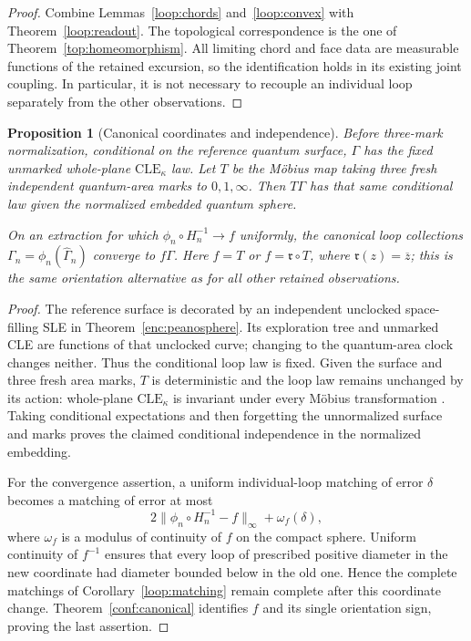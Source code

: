 \documentclass[11pt]{article}
\numberwithin{equation}{section}
\newtheorem{proposition}[theorem]{Proposition}
\theoremstyle{definition}
\theoremstyle{remark}
\newcommand{\1}{\mathbf 1}
\begin{document}
\begin{proof}
Combine Lemmas~\ref{loop:chords} and~\ref{loop:convex} with
Theorem~\ref{loop:readout}.  The topological correspondence is the
one of Theorem~\ref{top:homeomorphism}.  All limiting chord and face
data are measurable functions of the retained excursion, so the
identification holds in its existing joint coupling.  In particular,
it is not necessary to recouple an individual loop separately from
the other observations.
\end{proof}

\begin{proposition}[Canonical coordinates and independence]
\label{loop:canonical}
Before three-mark normalization, conditional on the reference quantum
surface, $\Gamma$ has the fixed unmarked whole-plane
$\mathrm{CLE}_{\kappa}$ law.  Let $T$ be the M\"obius map taking
three fresh independent quantum-area marks to $0,1,\infty$.
Then $T\Gamma$ has that same conditional law given the normalized
embedded quantum sphere.

On an extraction for which $\phi_n\circ H_n^{-1}\to f$ uniformly,
the canonical loop collections $\Gamma_n=\phi_n(\widehat\Gamma_n)$ converge to
$f\Gamma$.  Here $f=T$ or $f=\mathfrak r\circ T$, where
$\mathfrak r(z)=\overline z$; this is the same orientation alternative as
for all other retained observations.
\end{proposition}

\begin{proof}
The reference surface is decorated by an independent unclocked
space-filling SLE in Theorem~\ref{enc:peanosphere}.  Its exploration
tree and unmarked CLE are functions of that unclocked curve;
changing to the quantum-area clock changes neither.  Thus the
conditional loop law is fixed.  Given the surface and three fresh
area marks, $T$ is deterministic and the loop law remains unchanged
by its action: whole-plane $\mathrm{CLE}_{\kappa}$ is invariant
under every M\"obius transformation
\cite[Theorem~1.1]{GwynneMillerQianCLE}.  Taking conditional expectations and
then forgetting the unnormalized surface and marks proves the
claimed conditional independence in the normalized embedding.

For the convergence assertion, a uniform individual-loop matching
of error $\delta$ becomes a matching of error at most
\[
 2\|\phi_n\circ H_n^{-1}-f\|_\infty+\omega_f(\delta),
\]
where $\omega_f$ is a modulus of continuity of $f$ on the compact
sphere.  Uniform continuity of $f^{-1}$ ensures that every loop
of prescribed positive diameter in the new coordinate had diameter
bounded below in the old one.  Hence the complete matchings of
Corollary~\ref{loop:matching} remain complete after this coordinate
change.  Theorem~\ref{conf:canonical} identifies $f$ and its single
orientation sign, proving the last assertion.
\end{proof}
\end{document}
